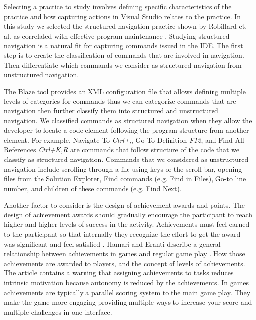 \documentclass{sig-alternate}
\begin{document}
Selecting a practice to study involves defining specific characteristics of the practice and how capturing actions in Visual Studio relates to the practice.  In this study we selected the structured navigation practice shown by Robillard et. al. as correlated with effective program maintenance \cite{wbsnipes:Robillard2004How} .  Studying structured navigation is a natural fit for capturing commands issued in the IDE.  The first step is to create the classification of commands that are involved in navigation.  Then differentiate which commands we consider as structured navigation from unstructured navigation.  

The Blaze tool provides an XML configuration file that allows defining multiple levels of categories for commands thus we can categorize commands that are navigation then further classify them into structured and unstructured navigation.
We classified commands as structured navigation when they allow the developer to locate a code element following the program structure from another element.  For example, Navigate To \textit{Ctrl+,}, Go To Definition \textit{F12}, and Find All References \textit{Ctrl+K,R} are commands that follow structure of the code that we classify as structured navigation.
Commands that we considered as unstructured navigation include scrolling through a file using keys or the scroll-bar, opening files from the Solution Explorer, Find commands (e.g. Find in Files), Go-to line number, and children of these commands (e.g. Find Next).

Another factor to consider is the design of achievement awards and points.  The design of achievement awards should gradually encourage the participant to reach higher and higher levels of success in the activity.  Achievements must feel earned to the participant so that internally they recognize the effort to get the award was significant and feel satisfied  \cite{wbsnipes:Hamari2011Framework}.  Hamari and Eranti describe a general relationship between achievements in games and regular game play  \cite{wbsnipes:Hamari2011Framework} .  How those achievements are awarded to players, and the concept of levels of achievements.  The article contains a warning that assigning achievements to tasks reduces intrinsic motivation because autonomy is reduced by the achievements.   In games achievements are typically a parallel scoring system to the main game play.  They make the game more engaging providing multiple ways to increase your score and multiple challenges in one interface.
\end{document}
